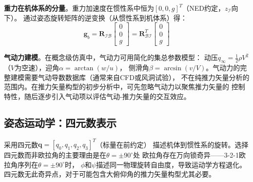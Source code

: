 \textbf{重力在机体系的分量}。重力加速度在惯性系中恒为$[0, 0, g]^T$（NED约定，$z_{\mathcal{I}}$向下）。
通过姿态旋转矩阵的逆变换（从惯性系到机体系）得：
\begin{equation}
    \bm{g}_b = \bm{R}_{\mathcal{I}\mathcal{B}}
    \begin{bmatrix} 0 \\ 0 \\ g \end{bmatrix}
    = \bm{R}_{\mathcal{B}\mathcal{I}}^T
    \begin{bmatrix} 0 \\ 0 \\ g \end{bmatrix}
    \label{eq:gravity_body}
\end{equation}

\textbf{气动力建模}。在概念级仿真中，气动力可用简化的集总参数模型\cite{beard2012small}：
动压$q_\infty = \frac{1}{2}\rho V^2$（$V$为空速），迎角$\alpha = \arctan(w/u)$，
侧滑角$\beta = \arcsin(v/V)$。气动力的完整建模需要气动导数数据库（通常来自CFD或风洞试验），
不在纯推力矢量分析的范围内。在推力矢量构型的初步分析中，可先忽略气动力以聚焦推力矢量的
控制特性，随后逐步引入气动项以评估气动-推力矢量的交互效应。

\subsection{姿态运动学：四元数表示}

采用四元数$\bm{q} = [q_0, q_1, q_2, q_3]^T$（标量在前约定）
描述机体到惯性系的旋转。选择四元数而非欧拉角的主要理由是在$\theta = \pm 90^\circ$处
欧拉角存在万向锁奇异——3-2-1欧拉角序列在$\theta = \pm 90^\circ$时，
$\phi$和$\psi$描述同一物理旋转自由度，导致运动学方程退化。
四元数无此奇异点，对于可能包含大俯仰角的推力矢量构型尤其必要\cite{markley2014fundamentals,kuipers1999quaternions}。


